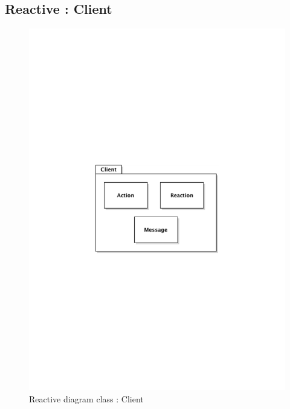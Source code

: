 	\subsection{Reactive : Client}
		\begin{figure}[ht]
			\begin{center}
				\includegraphics[width=\textwidth,  trim=2cm 11cm 2cm 10cm]{UML_figure/DC/core/reactive/DC_Client.pdf}
				\caption{Reactive diagram class : Client}
			\end{center}
		\end{figure}
